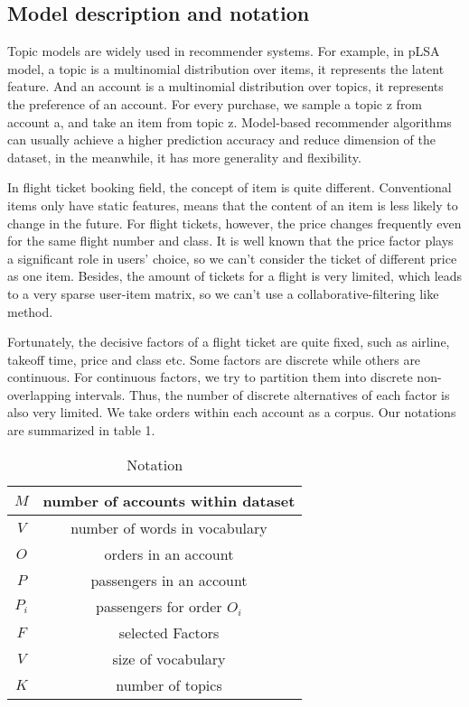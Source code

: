 \documentclass{sig-alternate-05-2015}
\begin{document}
\subsection{Model description and notation}
Topic models are widely used in recommender systems. For example, in pLSA model\cite{tomas:coll}, a topic is a multinomial distribution over items, it represents the latent feature. And an account is a multinomial distribution over topics, it represents the preference of an account. For every purchase, we sample a topic z from account a, and take an item from topic z. Model-based recommender algorithms can usually achieve a higher prediction accuracy and reduce dimension of the dataset, in the meanwhile, it has more generality and flexibility.\par
In flight ticket booking field, the concept of item is quite different. Conventional items only have static features, means that the content of an item is less likely to change in the future. For flight tickets, however, the price changes frequently even for the same flight number and class. It is well known that the price factor plays a significant role in users' choice, so we can't consider the ticket of different price as one item. Besides, the amount of tickets for a flight is very limited, which leads to a very sparse user-item matrix, so we can't use a collaborative-filtering like method.\par
Fortunately, the decisive factors of a flight ticket are quite fixed, such as airline, takeoff time, price and class etc. Some factors are discrete while others are continuous. For continuous factors, we try to partition them into discrete non-overlapping intervals. Thus, the number of discrete alternatives of each factor is also very limited. We take orders within each account as a corpus. Our notations are summarized in table 1.\par
\begin{table}[!htbp]
\centering
\caption{Notation}
\begin{tabular}{|c|c|} \hline
$M$ & number of accounts within dataset\\ \hline
$V$ & number of words in vocabulary\\ \hline
$O$ & orders in an account\\ \hline
$P$ & passengers in an account\\ \hline
$P_i$ & passengers for order $O_i$ \\ \hline
$F$ & selected Factors\\ \hline
$V$ & size of vocabulary\\ \hline
$K$ & number of topics\\ \hline
\end{tabular}
\end{table}
\end{document}
